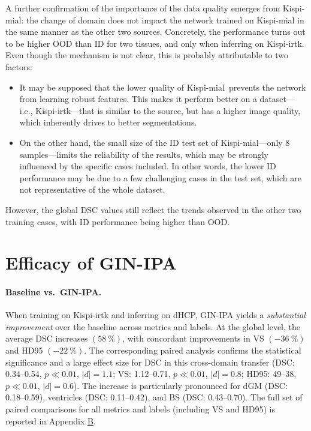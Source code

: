 A further confirmation of the importance of the data quality emerges from Kispi-mial: the change of domain does not impact the network trained on Kispi-mial in the same manner as the other two sources. Concretely, the performance turns out to be higher OOD than ID for two tissues, and only when inferring on Kispi-irtk. Even though the mechanism is not clear, this is probably attributable to two factors:
\begin{itemize}
    \item It may be supposed that the lower quality of Kispi-mial\,\cite{FeTA2021_review} prevents the network from learning robust features. This makes it perform better on a dataset---i.e., Kispi-irtk---that is similar to the source, but has a higher image quality, which inherently drives to better segmentations.
    \item On the other hand, the small size of the ID test set of Kispi-mial---only \num{8} samples---limits the reliability of the results, which may be strongly influenced by the specific cases included. In other words, the lower ID performance may be due to a few challenging cases in the test set, which are not representative of the whole dataset.
\end{itemize}
However, the global DSC values still reflect the trends observed in the other two training cases, with ID performance being higher than OOD.

\section{Efficacy of GIN-IPA}
\paragraph{Baseline vs.\ GIN-IPA.}
When training on Kispi-irtk and inferring on dHCP, GIN-IPA yields a \emph{substantial improvement} over the baseline across metrics and labels. At the global level, the average DSC increases $(\qty{+58}{\percent})$, with concordant improvements in VS $(\qty{-36}{\percent})$ and HD95 $(\qty{-22}{\percent})$. The corresponding paired analysis confirms the statistical significance and a large effect size for DSC in this cross-domain transfer (DSC: \numrange[range-open-phrase=from\ ]{0.34}{0.54}, $p \ll 0.01$, $|d|=1.1$; VS: \numrange[range-open-phrase=from\ ]{1.12}{0.71}, $p\ll 0.01$, $|d|=0.8$; HD95: \numrange[range-open-phrase=from\ ]{49}{38}, $p\ll 0.01$, $|d|=0.6$). The increase is particularly pronounced for dGM (DSC: \numrange[range-open-phrase=from\ ]{0.18}{0.59}), ventricles (DSC: \numrange[range-open-phrase=from\ ]{0.11}{0.42}), and BS (DSC: \numrange[range-open-phrase=from\ ]{0.43}{0.70}). The full set of paired comparisons for all metrics and labels (including VS and HD95) is reported in Appendix \hyperref[app:SupplementaryTables]{B}.

